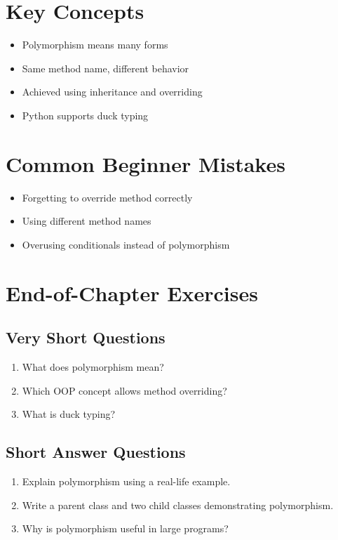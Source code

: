 \section{Key Concepts}

\begin{itemize}
    \item Polymorphism means many forms
    \item Same method name, different behavior
    \item Achieved using inheritance and overriding
    \item Python supports duck typing
\end{itemize}

\section{Common Beginner Mistakes}

\begin{itemize}
    \item Forgetting to override method correctly
    \item Using different method names
    \item Overusing conditionals instead of polymorphism
\end{itemize}

\section{End-of-Chapter Exercises}

\subsection{Very Short Questions}

\begin{enumerate}
    \item What does polymorphism mean?
    \item Which OOP concept allows method overriding?
    \item What is duck typing?
\end{enumerate}

\subsection{Short Answer Questions}

\begin{enumerate}
    \item Explain polymorphism using a real-life example.
    \item Write a parent class and two child classes demonstrating polymorphism.
    \item Why is polymorphism useful in large programs?
\end{enumerate}

